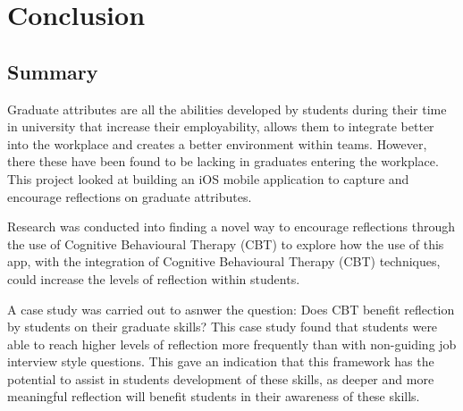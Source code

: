 \documentclass{l4proj}
\begin{document}


\chapter{Conclusion}  

\section{Summary}

Graduate attributes are all the abilities developed by students during their time in university that increase their employability, allows them to 
integrate better into the workplace and creates a better environment within teams. However, there these have been found to be lacking in graduates entering the workplace. This project looked at building an iOS mobile application to capture and encourage reflections on graduate attributes. 

Research was conducted into finding a novel way to encourage reflections through the use of Cognitive Behavioural Therapy (CBT) to explore how the use of this app, with the integration of Cognitive Behavioural Therapy (CBT) techniques, could increase the levels of reflection within students. 

A case study was carried out to asnwer the question: Does CBT benefit reflection by students on their graduate skills? This case study found that students were able to reach higher levels of reflection more frequently than with non-guiding job interview style questions. This gave an indication that this framework has the potential to assist in students development of these skills, as deeper and more meaningful reflection will benefit students in their awareness of these skills. 
\end{document}
